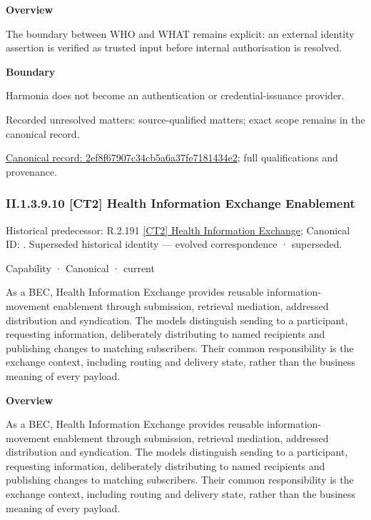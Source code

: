 \textbf{Overview}



The boundary between WHO and WHAT remains explicit: an external identity assertion is verified as trusted input before internal authorisation is resolved.



\textbf{Boundary}



Harmonia does not become an authentication or credential-issuance provider.


{\small Recorded unresolved matters: source-qualified matters; exact scope remains in the canonical record.}\par
{\footnotesize \href{../../../../continuum/strategy/capability/feature/2ef8f67907c34cb5a6a37fe7181434e2.md}{Canonical record: 2ef8f67907c34cb5a6a37fe7181434e2}; full qualifications and provenance.}\par
\subsubsection*{II.1.3.9.10 [CT2] Health Information Exchange Enablement}
\label{navigation:II.1.3.9.10}

{\small Historical predecessor: R.2.191 \hyperref[element:330d1c43856a4322a2e9f331b1a5ed20]{[CT2] Health Information Exchange}; Canonical ID: \texttt{}. Superseded historical identity — evolved correspondence · superseded.}\par
\label{element:a61a15908ed544e6acf3e9cab63a0267}
{\small Capability · Canonical · current}\par

As a BEC, Health Information Exchange provides reusable information-movement enablement through submission, retrieval mediation, addressed distribution and syndication. The models distinguish sending to a participant, requesting information, deliberately distributing to named recipients and publishing changes to matching subscribers. Their common responsibility is the exchange context, including routing and delivery state, rather than the business meaning of every payload.



\textbf{Overview}



As a BEC, Health Information Exchange provides reusable information-movement enablement through submission, retrieval mediation, addressed distribution and syndication. The models distinguish sending to a participant, requesting information, deliberately distributing to named recipients and publishing changes to matching subscribers. Their common responsibility is the exchange context, including routing and delivery state, rather than the business meaning of every payload.



